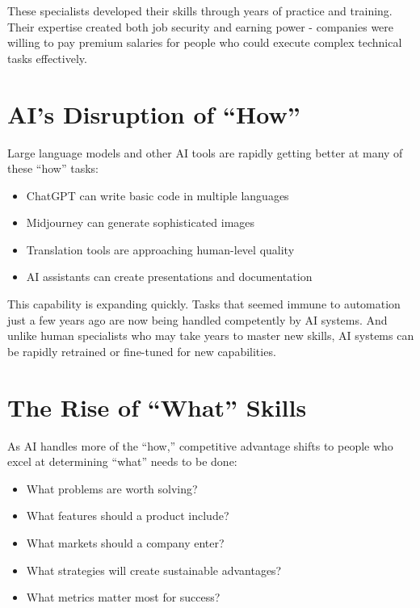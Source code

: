 \documentclass[
  Letterpaper,
]{scrbook}
\providecommand{\tightlist}{%
  \setlength{\itemsep}{0pt}\setlength{\parskip}{0pt}}\usepackage{longtable,booktabs,array}
\begin{document}
These specialists developed their skills through years of practice and
training. Their expertise created both job security and earning power -
companies were willing to pay premium salaries for people who could
execute complex technical tasks effectively.

\section{AI's Disruption of ``How''}\label{ais-disruption-of-how}

Large language models and other
AI tools are rapidly getting better at many of these ``how'' tasks:

\begin{itemize}
\tightlist
\item
  ChatGPT can write basic code in multiple
  languages
\item
  Midjourney can generate sophisticated images
\item
  Translation tools are approaching human-level quality
\item
  AI assistants can create presentations and documentation
\end{itemize}

This capability is expanding quickly. Tasks that seemed immune to
automation just a few years ago are now
being handled competently by AI systems. And unlike human specialists
who may take years to master new skills, AI systems can be rapidly
retrained or fine-tuned for new capabilities.

\section{The Rise of ``What'' Skills}\label{the-rise-of-what-skills}

As AI handles more of the ``how,'' competitive advantage shifts to
people who excel at determining ``what'' needs to be done:

\begin{itemize}
\tightlist
\item
  What problems are worth solving?
\item
  What features should a product include?
\item
  What markets should a company enter?
\item
  What strategies will create sustainable advantages?
\item
  What metrics matter most for success?
\end{itemize}
\end{document}
